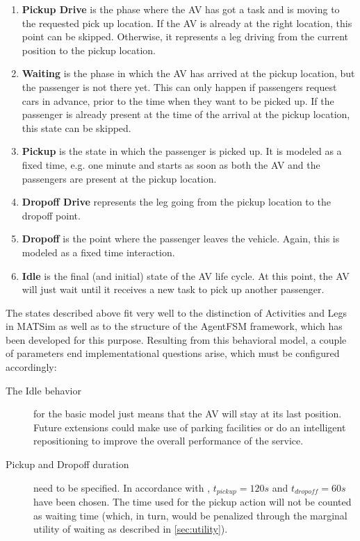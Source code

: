 \begin{enumerate}
\item \textbf{Pickup Drive} is the phase where the AV has got a task and is moving
to the requested pick up location. If the AV is already at the right location, this
point can be skipped. Otherwise, it represents a leg driving from the current position
to the pickup location.
\item \textbf{Waiting} is the phase in which the AV has arrived at the pickup
location, but the passenger is not there yet. This can only happen if passengers
request cars in advance, prior to the time when they want to be picked
up. If the passenger is already present at the time of the arrival at the pickup
location, this state can be skipped.
\item \textbf{Pickup} is the state in which the passenger is picked up. It is
modeled as a fixed time, e.g. one minute and starts as soon as both the AV
and the passengers are present at the pickup location.
\item \textbf{Dropoff Drive} represents the leg going from the pickup location to
the dropoff point.
\item \textbf{Dropoff} is the point where the passenger leaves the vehicle. Again,
this is modeled as a fixed time interaction.
\item \textbf{Idle} is the final (and initial) state of the AV life cycle. At this
point, the AV will just wait until it receives a new task to pick up another passenger.
\end{enumerate}

The states described above fit very well to the distinction of Activities and Legs
in MATSim as well as to the structure of the AgentFSM framework, which has been
developed for this purpose. Resulting from this behavioral model, a couple of
parameters end implementational questions arise, which must be configured accordingly:

\begin{description}
\item[The Idle behavior] for the basic model just means that the AV will stay at
its last position. Future extensions could make use of parking facilities or do
an intelligent repositioning to improve the overall performance of the service.

\item[Pickup and Dropoff duration] need to be specified. In accordance with
\citet{Bischoff2016}, $t_{pickup} = 120s$ and $t_{dropoff} = 60s$ have been chosen. The time
used for the pickup action will not be counted as waiting time (which, in turn,
would be penalized through the marginal utility of waiting as described in \cref{sec:utility}).
\end{description}

